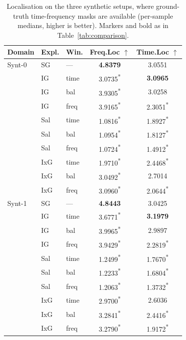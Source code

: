 \begin{table}[t]
\centering
\caption{Localisation on the three synthetic setups, where ground-truth time-frequency masks are available (per-sample medians, higher is better). Markers and bold as in Table~\ref{tab:comparison}.}
\label{tab:localisation}
\begin{tabular}{@{}lllcc@{}}
\toprule
\textbf{Domain} & \textbf{Expl.} & \textbf{Win.} & \textbf{Freq.Loc} $\uparrow$ & \textbf{Time.Loc} $\uparrow$ \\
\midrule
Synt-0 & SG & --- & \textbf{4.8379} & 3.0551 \\
 & IG & time & 3.0735\textsuperscript{*} & \textbf{3.0965} \\
 & IG & bal & 3.9305\textsuperscript{*} & 3.0258 \\
 & IG & freq & 3.9165\textsuperscript{*} & 2.3051\textsuperscript{*} \\
 & Sal & time & 1.0816\textsuperscript{*} & 1.8927\textsuperscript{*} \\
 & Sal & bal & 1.0954\textsuperscript{*} & 1.8127\textsuperscript{*} \\
 & Sal & freq & 1.0724\textsuperscript{*} & 1.4912\textsuperscript{*} \\
 & IxG & time & 1.9710\textsuperscript{*} & 2.4468\textsuperscript{*} \\
 & IxG & bal & 3.0492\textsuperscript{*} & 2.7014 \\
 & IxG & freq & 3.0960\textsuperscript{*} & 2.0644\textsuperscript{*} \\
\midrule
Synt-1 & SG & --- & \textbf{4.8443} & 3.0425 \\
 & IG & time & 3.6771\textsuperscript{*} & \textbf{3.1979} \\
 & IG & bal & 3.9965\textsuperscript{*} & 2.9897 \\
 & IG & freq & 3.9429\textsuperscript{*} & 2.2819\textsuperscript{*} \\
 & Sal & time & 1.2499\textsuperscript{*} & 1.7670\textsuperscript{*} \\
 & Sal & bal & 1.2233\textsuperscript{*} & 1.6804\textsuperscript{*} \\
 & Sal & freq & 1.2063\textsuperscript{*} & 1.3732\textsuperscript{*} \\
 & IxG & time & 2.9700\textsuperscript{*} & 2.6036 \\
 & IxG & bal & 3.2841\textsuperscript{*} & 2.4416\textsuperscript{*} \\
 & IxG & freq & 3.2790\textsuperscript{*} & 1.9172\textsuperscript{*} \\

\end{tabular}
\end{table}
